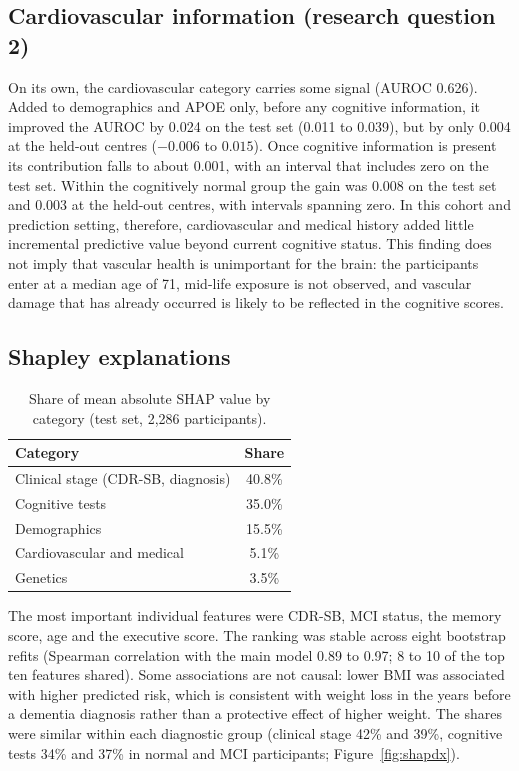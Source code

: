 \subsection{Cardiovascular information (research question 2)}

On its own, the cardiovascular category carries some signal (AUROC 0.626). Added to demographics and APOE only, before any cognitive information, it improved the AUROC by 0.024 on the test set (0.011 to 0.039), but by only 0.004 at the held-out centres ($-0.006$ to $0.015$). Once cognitive information is present its contribution falls to about 0.001, with an interval that includes zero on the test set. Within the cognitively normal group the gain was 0.008 on the test set and 0.003 at the held-out centres, with intervals spanning zero. In this cohort and prediction setting, therefore, cardiovascular and medical history added little incremental predictive value beyond current cognitive status. This finding does not imply that vascular health is unimportant for the brain: the participants enter at a median age of 71, mid-life exposure is not observed, and vascular damage that has already occurred is likely to be reflected in the cognitive scores.

\subsection{Shapley explanations}

\begin{table}[H]
\centering\small
\caption{Share of mean absolute SHAP value by category (test set, 2,286 participants).}
\label{tab:shap}
\begin{tabular}{@{}lc@{}}
\toprule
Category & Share \\
\midrule
Clinical stage (CDR-SB, diagnosis) & 40.8\% \\
Cognitive tests & 35.0\% \\
Demographics & 15.5\% \\
Cardiovascular and medical & 5.1\% \\
Genetics & 3.5\% \\
\bottomrule
\end{tabular}
\end{table}

The most important individual features were CDR-SB, MCI status, the memory score, age and the executive score. The ranking was stable across eight bootstrap refits (Spearman correlation with the main model 0.89 to 0.97; 8 to 10 of the top ten features shared). Some associations are not causal: lower BMI was associated with higher predicted risk, which is consistent with weight loss in the years before a dementia diagnosis rather than a protective effect of higher weight. The shares were similar within each diagnostic group (clinical stage 42\% and 39\%, cognitive tests 34\% and 37\% in normal and MCI participants; Figure~\ref{fig:shapdx}).

